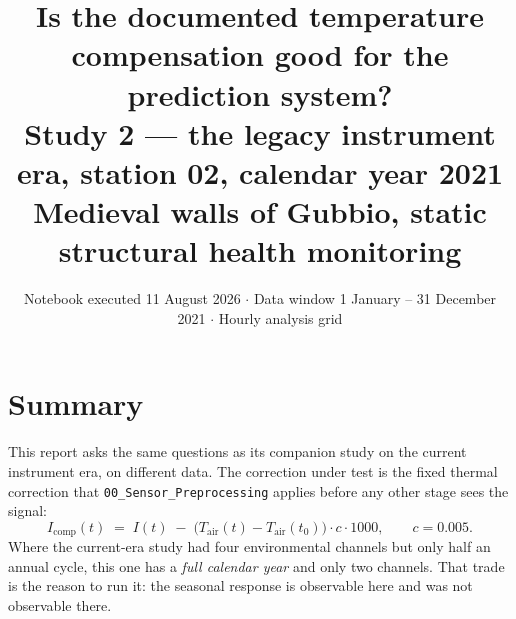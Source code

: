 \documentclass[11pt,a4paper]{article}
\title{\vspace{-1.4cm}\bfseries Is the documented temperature compensation good for
the prediction system?\\[4pt]
\large\mdseries Study 2 --- the legacy instrument era, station 02, calendar year 2021\\
\large\mdseries Medieval walls of Gubbio, static structural health monitoring}
\author{}
\date{Notebook executed 11 August 2026 \quad$\cdot$\quad
Data window 1 January -- 31 December 2021 \quad$\cdot$\quad
Hourly analysis grid}
\begin{document}
\maketitle
\thispagestyle{fancy}

\section*{Summary}

This report asks the same questions as its companion study on the current instrument
era, on different data. The correction under test is the fixed thermal correction that
\texttt{00\_Sensor\_Preprocessing} applies before any other stage sees the signal:
%
\begin{equation}
I_{\text{comp}}(t) \;=\; I(t) \;-\; \bigl(T_{\text{air}}(t) - T_{\text{air}}(t_0)\bigr)
\cdot c \cdot 1000 ,
\qquad c = 0.005 .
\label{eq:comp}
\end{equation}
%
Where the current-era study had four environmental channels but only half an annual
cycle, this one has a \emph{full calendar year} and only two channels. That trade is
the reason to run it: the seasonal response is observable here and was not observable
there.

\end{document}
